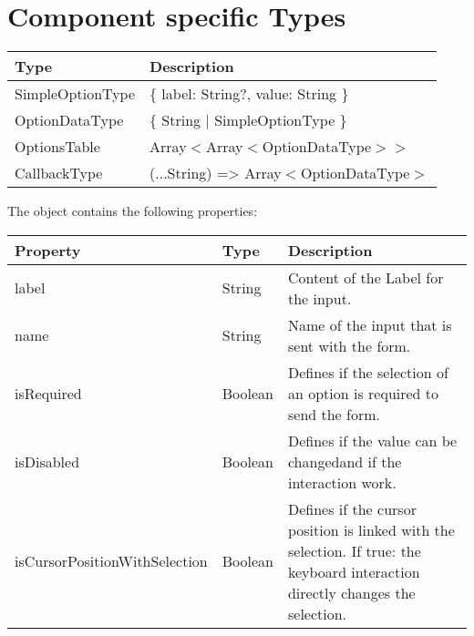 \section*{Component specific Types}

\begin{table}[!htb] 
    \label{api:selectComponentTypes}
    \footnotesize
    \setlength\extrarowheight{4pt}
    \begin{tabular}{ p{5cm} p{8cm}}
        \toprule[1.2pt]
        \textbf{Type}    & \textbf{Description} \\
        \midrule    
        SimpleOptionType & \{ label: String?, value: String \}    \\
        OptionDataType   & \{ String | SimpleOptionType \}        \\
        OptionsTable     & Array$<$Array$<$OptionDataType$>>$       \\
        CallbackType     & (...String) => Array$<$OptionDataType$>$ \\
        \bottomrule[1.2pt]
    \end{tabular}
\end{table}

\vspace*{12pt}
The  object contains the following properties: 

\begin{table}[!htb] 
    \label{api:selectComponentSelectAttributes}
    \footnotesize
    \setlength\extrarowheight{4pt}
    \begin{tabular}{ p{4cm} p{3cm} p{6cm} }
        \toprule[1.2pt]
        \textbf{Property}             & \textbf{Type} & \textbf{Description} \\
        \midrule
        label                         & String        & Content of the Label for the input. \\
        name                          & String        & Name of the input that is sent with the form. \\
        isRequired                    & Boolean       & Defines if the selection of an option is required to send the form. \\
        isDisabled                    & Boolean       & Defines if the value can be changedand if the interaction work. \\
        isCursorPositionWithSelection & Boolean       & Defines if the cursor position is linked with the selection. 
                                                        If true: the keyboard interaction directly changes the selection. \\
        \bottomrule[1.2pt]
    \end{tabular}
\end{table}


